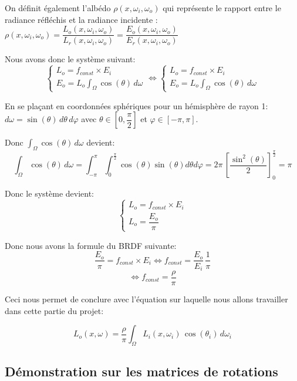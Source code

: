 On définit également l'albédo $\rho(x, \omega_i, \omega_o)$ qui représente le rapport entre le radiance réfléchis et la radiance incidente : $\rho(x, \omega_i, \omega_o)=\dfrac{L_o(x, \omega_i, \omega_o)}{L_r(x, \omega_i, \omega_o)} = \dfrac{E_o(x, \omega_i, \omega_o)}{E_r(x, \omega_i, \omega_o)}$

Nous avons donc le système suivant:
$$
\begin{cases}
	L_o = f_{const}\times E_i \\
	E_o = L_o\int_{\Omega}\cos(\theta) \, d\omega
\end{cases}
\Leftrightarrow\begin{cases}
	L_o = f_{const}\times E_i \\
	E_o = L_o\int_{\Omega}\cos(\theta) \, d\omega
\end{cases}
$$

En se plaçant en coordonnées sphériques pour un hémisphère de rayon 1: $d\omega = \sin(\theta) \, d\theta \, d\varphi$ avec $\theta \in [0,\dfrac{\pi}{2}]$ et $\varphi\in[-\pi,\pi]$.

Donc $\int_{\Omega}\cos(\theta) \, d\omega$ devient:
$$\int_{\Omega}\cos(\theta) \, d\omega = \int_{-\pi}^{\pi} \int_{0}^{\frac{\pi}{2}} \cos(\theta)\sin(\theta)d\theta d\varphi = 2\pi \, \left[\frac{\sin^2(\theta)}{2}\right]_0^\frac{\pi}{2} = \boxed{\pi}$$

Donc le système devient:
$$
\begin{cases}
L_o = f_{const}\times E_i \\
L_o = \dfrac{E_o}{\pi}
\end{cases}
$$

Donc nous avons la formule du BRDF suivante:
$$\frac{E_o}{\pi} = f_{const}\times E_i \Leftrightarrow f_{const} = \frac{E_o}{E_i} \, \frac1{\pi}$$
$$\Leftrightarrow f_{const} = \boxed{\frac\rho\pi} $$


Ceci nous permet de conclure avec l'équation sur laquelle nous allons travailler dans cette partie du projet:

$$ 
\boxed{L_o(x, \omega) = \frac\rho\pi \int_\Omega L_i(x, \omega_i) \, \cos(\theta_i) \, d\omega_i}
$$


\subsection{Démonstration sur les matrices de rotations}
\label{subsec:mat_rot}

